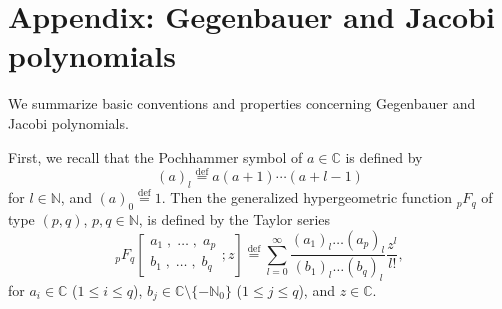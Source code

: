 \documentclass[a4paper,12pt,reqno]{amsart}
\numberwithin{theorem}{subsection}
\numberwithin{equation}{section}
\begin{document}
\section*{Appendix: Gegenbauer and Jacobi polynomials}\label{app}

We summarize basic conventions and properties concerning Gegenbauer and Jacobi
polynomials.

First, we recall that the Pochhammer symbol of $a\in{\mathbb{C}}$ is defined by
$$
   (a)_l {\stackrel{\text{def}}{=}} a(a+1) \cdots (a+l-1)
$$
for $l\in{\mathbb{N}}$, and $(a)_0 {\stackrel{\text{def}}{=}} 1$. Then the generalized hypergeometric function
${}_pF_q$ of type $(p,q)$, $p,q\in{\mathbb{N}}$, is defined by the Taylor series
\begin{equation}
    {}_pF_q\left[\begin{matrix}a_1\;,\;\dots\;,\;a_p\\b_1\;,\;\dots\;,\;b_q\end{matrix};z\right]
      {\stackrel{\text{def}}{=}} \sum_{l=0}^\infty\frac{(a_1)_l\dots (a_p)_l}{(b_1)_l\dots (b_q)_l}\frac{z^l}{l!},
\end{equation}
for $a_i\in{\mathbb{C}}$ ($1\leq i\leq q$), $b_j\in{\mathbb{C}}\setminus\{-{\mathbb{N}}_0\}$ ($1\leq j\leq
q$), and $z\in{\mathbb{C}}$.
\end{document}
